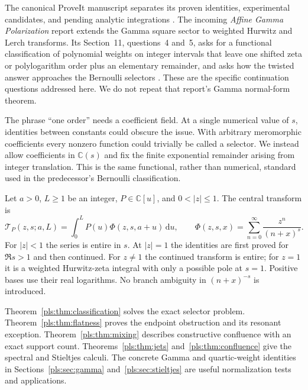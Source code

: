 \documentclass[11pt,letterpaper]{article}
\numberwithin{equation}{section}
\theoremstyle{definition}
\theoremstyle{remark}\newtheorem{remark}[theorem]{Remark}
\newcommand{\C}{\mathbb C}\newcommand{\Q}{\mathbb Q}
\newcommand{\dd}{\,\mathrm d}
\newcommand{\T}{\mathcal T}
\begin{document}
The canonical ProveIt manuscript separates its proven identities,
experimental candidates, and pending analytic integrations
\cite{Manuscript}. The incoming \emph{Affine Gamma Polarization} report
extends the Gamma square sector to weighted Hurwitz and Lerch
transforms. Its Section~11, questions~4 and~5, asks for a functional
classification of polynomial weights on integer intervals that leave
one shifted zeta or polylogarithm order plus an elementary remainder,
and asks how the twisted answer approaches the Bernoulli selectors
\cite{Affine}. These are the specific continuation questions addressed
here. We do not repeat that report's Gamma normal-form theorem.

The phrase ``one order'' needs a coefficient field. At a single
numerical value of $s$, identities between constants could obscure the
issue. With arbitrary meromorphic coefficients every nonzero function
could trivially be called a selector. We instead allow coefficients in
$\C(s)$ and fix the finite exponential remainder arising from integer
translation. This is the same functional, rather than numerical,
standard used in the predecessor's Bernoulli classification.

Let $a>0$, $L\ge1$ be an integer, $P\in\C[u]$, and
$0<|z|\le1$. The central transform is
\begin{equation}\label{pls:eq:transform}
 \T_P(z,s;a,L)=\int_0^L P(u)\Phi(z,s,a+u)\dd u,
 \qquad
 \Phi(z,s,x)=\sum_{n=0}^\infty\frac{z^n}{(n+x)^s}.
\end{equation}
For $|z|<1$ the series is entire in $s$. At $|z|=1$ the identities
are first proved for $\Re s>1$ and then continued. For $z\ne1$ the
continued transform is entire; for $z=1$ it is a weighted Hurwitz-zeta
integral with only a possible pole at $s=1$. Positive bases use their
real logarithms. No branch ambiguity in $(n+x)^{-s}$ is introduced.

Theorem~\ref{pls:thm:classification} solves the exact selector problem.
Theorem~\ref{pls:thm:flatness} proves the endpoint obstruction and its
resonant exception. Theorem~\ref{pls:thm:mixing} describes constructive
confluence with an exact support count.
Theorems~\ref{pls:thm:jets} and~\ref{pls:thm:confluence} give the
spectral and Stieltjes calculi. The concrete Gamma and quartic-weight
identities in Sections~\ref{pls:sec:gamma} and~\ref{pls:sec:stieltjes}
are useful normalization tests and applications.
\end{document}
